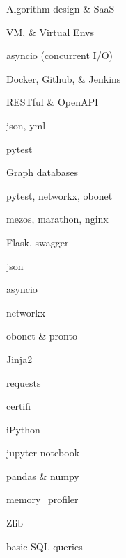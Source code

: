 \documentclass[letterpaper,final]{memoir}
\newcommand{\Sep}{\vspace{1.0em}}
\begin{document}
\begin{multicols}{2}

    \begin{compactitem}[\color{Blue}$\circ$]
		
		\item Algorithm design \& SaaS
		
        \item VM, \& Virtual Envs
        
        \item asyncio (concurrent I/O)
		
        \item Docker, Github, \& Jenkins
        
        \item RESTful \& OpenAPI
        
        \item json, yml
        
        \item pytest
   
        \item Graph databases
        
        \item pytest, networkx, obonet
  
        \item mezos, marathon, nginx
        
        \item Flask, swagger
        \item json
        \item asyncio
        \item networkx
        \item obonet \& pronto
        \item Jinja2
        \item requests
        \item certifi
        \item iPython
        \item jupyter notebook
        \item pandas \& numpy
        \item memory\_profiler
        \item Zlib
        \item basic SQL queries
        \item 
      
    \end{compactitem}

\end{multicols}
\Sep
\end{document}
